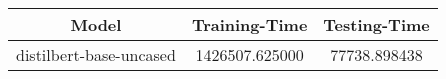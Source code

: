 \begin{tabular}{ccc}
\toprule
Model & Training-Time & Testing-Time \\
\midrule
distilbert-base-uncased & 1426507.625000 & 77738.898438 \\
\bottomrule
\end{tabular}
